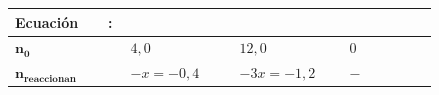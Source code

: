 \begin{exerciseEVAU}
\begin{solu}
        \begin{table}[H]
            \begin{tabular}{@{}C{0.21\linewidth} @{\,}c@{\,} C{0.21\linewidth} @{\,}c@{\,} C{0.21\linewidth} @{\,}c@{\,} C{0.21\linewidth}@{}}
                \toprule
                \textbf{Ecuación} & : & \textbf{} & \ch{+} & \textbf{} & \ch{->} & \textbf{} \\
                \midrule
                \(\bm{n_0}\) &  & \(4{,}0\) &  & \(12{,}0\) &  & \(0\) \\[3pt]
                \(\bm{n_{\text{reaccionan}}}\) &  & \(-x = -0{,}4\) &  & \(-3x = -1{,}2\) &  & \(-\) \\[3pt]

\end{tabular}
\end{table}
\end{solu}
\end{exerciseEVAU}
